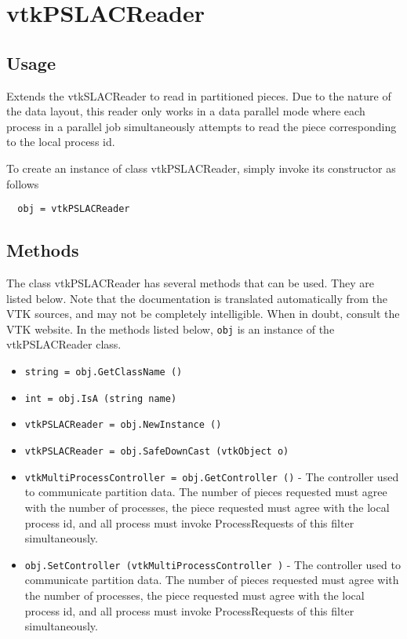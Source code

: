 \section{vtkPSLACReader}

\subsection{Usage}


 Extends the vtkSLACReader to read in partitioned pieces.  Due to the nature
 of the data layout, this reader only works in a data parallel mode where
 each process in a parallel job simultaneously attempts to read the piece
 corresponding to the local process id.


To create an instance of class vtkPSLACReader, simply
invoke its constructor as follows
\begin{verbatim}
  obj = vtkPSLACReader
\end{verbatim}
\subsection{Methods}

The class vtkPSLACReader has several methods that can be used.
  They are listed below.
Note that the documentation is translated automatically from the VTK sources,
and may not be completely intelligible.  When in doubt, consult the VTK website.
In the methods listed below, \verb|obj| is an instance of the vtkPSLACReader class.
\begin{itemize}
\item  \verb|string = obj.GetClassName ()|

\item  \verb|int = obj.IsA (string name)|

\item  \verb|vtkPSLACReader = obj.NewInstance ()|

\item  \verb|vtkPSLACReader = obj.SafeDownCast (vtkObject o)|

\item  \verb|vtkMultiProcessController = obj.GetController ()| -  The controller used to communicate partition data.  The number of pieces
 requested must agree with the number of processes, the piece requested must
 agree with the local process id, and all process must invoke
 ProcessRequests of this filter simultaneously.

\item  \verb|obj.SetController (vtkMultiProcessController )| -  The controller used to communicate partition data.  The number of pieces
 requested must agree with the number of processes, the piece requested must
 agree with the local process id, and all process must invoke
 ProcessRequests of this filter simultaneously.

\end{itemize}
